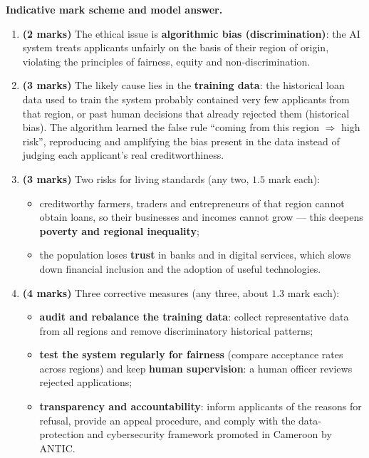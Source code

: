 \documentclass[11pt]{article}
\begin{document}
\begin{corrige}
\textbf{Indicative mark scheme and model answer.}
\begin{enumerate}
\item \textbf{(2 marks)} The ethical issue is \textbf{algorithmic bias (discrimination)}: the AI system treats applicants unfairly on the basis of their region of origin, violating the principles of fairness, equity and non-discrimination.
\item \textbf{(3 marks)} The likely cause lies in the \textbf{training data}: the historical loan data used to train the system probably contained very few applicants from that region, or past human decisions that already rejected them (historical bias). The algorithm learned the false rule ``coming from this region $\Rightarrow$ high risk'', reproducing and amplifying the bias present in the data instead of judging each applicant's real creditworthiness.
\item \textbf{(3 marks)} Two risks for living standards (any two, $1.5$ mark each):
\begin{itemize}
\item creditworthy farmers, traders and entrepreneurs of that region cannot obtain loans, so their businesses and incomes cannot grow — this deepens \textbf{poverty and regional inequality};
\item the population loses \textbf{trust} in banks and in digital services, which slows down financial inclusion and the adoption of useful technologies.
\end{itemize}
\item \textbf{(4 marks)} Three corrective measures (any three, about $1.3$ mark each):
\begin{itemize}
\item \textbf{audit and rebalance the training data}: collect representative data from all regions and remove discriminatory historical patterns;
\item \textbf{test the system regularly for fairness} (compare acceptance rates across regions) and keep \textbf{human supervision}: a human officer reviews rejected applications;
\item \textbf{transparency and accountability}: inform applicants of the reasons for refusal, provide an appeal procedure, and comply with the data-protection and cybersecurity framework promoted in Cameroon by ANTIC.
\end{itemize}
\end{enumerate}
\end{corrige}
\end{document}
